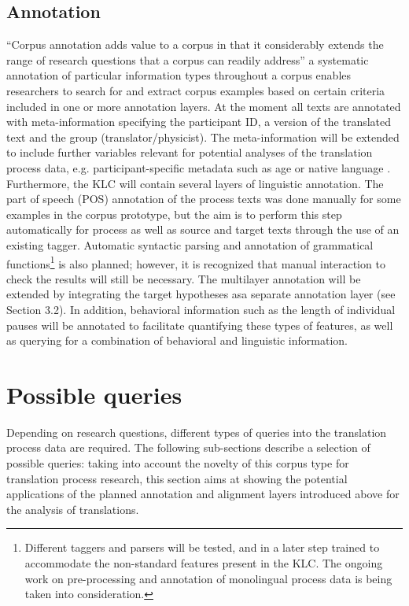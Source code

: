 \documentclass[output=paper]{LSP/langsci}
\begin{document}
\subsection{Annotation}
“Corpus annotation adds value to a corpus in that it considerably extends the range of research questions that a corpus can readily address” \citep[29]{McEnery2006} a systematic annotation of particular information types throughout a corpus enables researchers to search for and extract corpus examples based on certain criteria included in one or more annotation layers. At the moment all texts are annotated with meta-information specifying the participant ID, a version of the translated text and the group (translator/physicist). The meta-information will be extended to include further variables relevant for potential analyses of the translation process data, e.g. participant-specific metadata such as age or native language \citep[see][]{Hvelplund2012}. Furthermore, the KLC will contain several layers of linguistic annotation. The part of speech (POS) annotation of the process texts was done manually for some examples in the corpus prototype, but the aim is to perform this step automatically for process as well as source and target texts through the use of an existing tagger. Automatic syntactic parsing and annotation of grammatical functions\footnote{Different taggers and parsers will be tested, and in a later step trained to accommodate the non-standard features present in the KLC. The ongoing work on pre-processing and annotation of monolingual process data \citep{Leijten2012,Macken2012} is being taken into consideration.} is also planned; however, it is recognized that manual interaction to check the results will still be necessary. The multilayer annotation \citep[see][]{Hansen-Schirra2006} will be extended by integrating the target hypotheses asa separate annotation layer (see Section 3.2). In addition, behavioral information such as the length of individual pauses \citep[see][]{Alves2009,Alves2011} will be annotated to facilitate quantifying these types of features, as well as querying for a combination of behavioral and linguistic information.

\section{Possible queries}
Depending on research questions, different types of queries into the translation process data are required. The following sub-sections describe a selection of possible queries: taking into account the novelty of this corpus type for translation process research, this section aims at showing the potential applications of the planned annotation and alignment layers introduced above for the analysis of translations.
\end{document}
